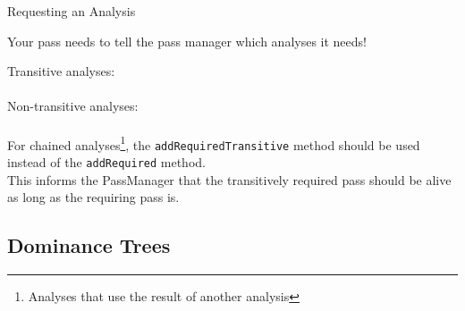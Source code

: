 \begin{frame}{Requesting an Analysis}
\begin{center}
Your pass needs to tell the pass manager which analyses it needs!

\vfill
Transitive analyses:\\
\\
\medskip
Non-transitive analyses: \\
\\

\vfill
For \alert{chained analyses}\footnote{Analyses that use the result of another analysis}, the \texttt{addRequiredTransitive} method
should be used instead of the \texttt{addRequired} method.\\
\medskip
{\small
This informs the PassManager that the transitively required pass
should be alive as long as the requiring pass is.}
\end{center}
\end{frame}


\subsection{Dominance Trees}


